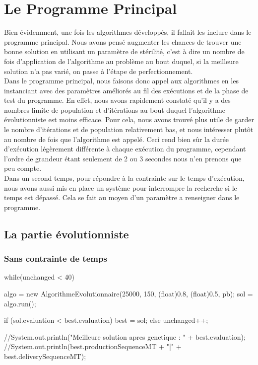 \section{Le Programme Principal}
Bien évidemment, une fois les algorithmes développés, il fallait les inclure dans le programme principal. Nous avons pensé augmenter les chances de trouver une bonne solution en utilisant un paramètre de stérilité, c'est à dire un nombre de fois d'application de l'algorithme au problème au bout duquel, si la meilleure solution n'a pas varié, on passe à l'étape de perfectionnement.\\
Dans le programme principal, nous faisons donc appel aux algorithmes en les instanciant avec des paramètres améliorés au fil des exécutions et de la phase de test du programme. En effet, nous avons rapidement constaté qu'il y a des nombres limite de population et d'itérations au bout duquel l'algorithme évolutionniste est moins efficace. Pour cela, nous avons trouvé plus utile de garder le nombre d'itérations et de population relativement bas, et nous intéresser plutôt au nombre de fois que l'algorithme est appelé. Ceci rend bien sûr la durée d'exécution légèrement différente à chaque exécution du programme, cependant l'ordre de grandeur étant seulement de 2 ou 3 secondes nous n'en prenons que peu compte.\\
Dans un second temps, pour répondre à la contrainte sur le temps d'exécution, nous avons aussi mis en place un système pour interrompre la recherche si le temps est dépassé. Cela se fait au moyen d'un paramètre a renseigner dans le programme.

\subsection{La partie évolutionniste}
\subsubsection{Sans contrainte de temps}

\begin{java}
while(unchanged < 40) {
	algo = new AlgorithmeEvolutionnaire(25000, 150, (float)0.8, (float)0.5, pb);
	sol = algo.run();
	
	if (sol.evaluation < best.evaluation)
		best = sol;
	else
		unchanged++;
}

//System.out.println("Meilleure solution apres genetique : " + best.evaluation);
//System.out.println(best.productionSequenceMT + "|" + best.deliverySequenceMT);
\end{java}

